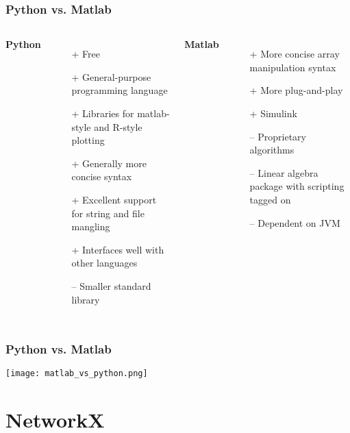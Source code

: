 \documentclass{beamer}
\begin{document}
\begin{frame}
\frametitle{Python vs. Matlab}
\begin{columns}[t]

\textbf{Python}
\begin{itemize}
\item[+] Free
\item[+] General-purpose programming language
\item[+] Libraries for matlab-style and R-style plotting
\item[+] Generally more concise syntax
\item[+] Excellent support for string and file mangling
\item[+] Interfaces well with other languages
\item[--] Smaller standard library
\end{itemize}

\textbf{Matlab}
\begin{itemize}
\item[+] More concise array manipulation syntax
\item[+] More plug-and-play
\item[+] Simulink
\item[--] Proprietary algorithms
\item[--] Linear algebra package with scripting tagged on
\item[--] Dependent on JVM

\end{itemize}
\end{columns}
\end{frame}

\begin{frame}
\frametitle{Python vs. Matlab}
\begin{center}
\texttt{[image: matlab\_vs\_python.png]}
\end{center}
\end{frame}

\section{NetworkX}
\end{document}
